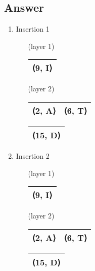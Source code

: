 \documentclass{article}
\begin{document}
\subsection{Answer}
\begin{enumerate}
    \item Insertion 1
    \begin{enumerate}
        \item [(layer 1)]
            \begin{tabular}{|c|}
                \hline
                 ⟨9, I⟩ \\
                 \hline
            \end{tabular} \;
        \item [(layer 2)]
            \begin{tabular}{|c|c|}
                \hline
                 ⟨2, A⟩ & ⟨6, T⟩ \\
                \hline
            \end{tabular} \;
            \begin{tabular}{|c|}
                \hline
                 ⟨15, D⟩ \\
                \hline
            \end{tabular} \;
    \end{enumerate}
    
    \item Insertion 2
    \begin{enumerate}
        \item [(layer 1)]
            \begin{tabular}{|c|}
                \hline
                 ⟨9, I⟩ \\
                 \hline
            \end{tabular} \;
        \item [(layer 2)]
            \begin{tabular}{|c|c|}
                \hline
                 ⟨2, A⟩ & ⟨6, T⟩ \\
                \hline
            \end{tabular} \;
            \begin{tabular}{|c|}
                \hline
                 ⟨15, D⟩ \\
                \hline
            \end{tabular} \;
    \end{enumerate}
    

\end{enumerate}
\end{document}
